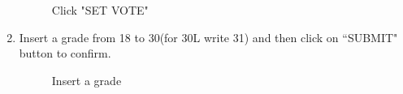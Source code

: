 \documentclass[ManualeUtente]{subfiles}
\begin{document}
\begin{enumerate}
\begin{figure}[H]
		\caption{Click "SET VOTE"}
		\label{fig:Click "SET VOTE"}
	\end{figure}
	\item Insert a grade from 18 to 30(for 30L write 31) and then click on \textquotedblleft SUBMIT" button to confirm.
	\begin{figure}[H]
		\centering
		\caption{Insert a grade}
		\label{fig:Insert a grade}
	\end{figure}
\end{enumerate}
\end{document}
